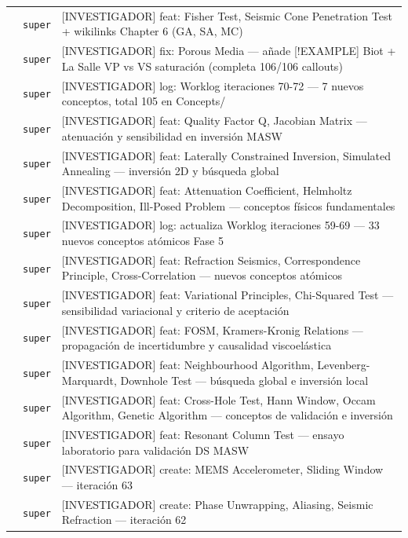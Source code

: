 \begin{longtable}{@{}p{1.7cm} p{1.5cm} p{12.2cm}@{}}
 & \texttt{\scriptsize super} & [INVESTIGADOR] feat: Fisher Test, Seismic Cone Penetration Test + wikilinks Chapter 6 (GA, SA, MC) \\
 & \texttt{\scriptsize super} & [INVESTIGADOR] fix: Porous Media --- añade [!EXAMPLE] Biot + La Salle VP vs VS saturación (completa 106/106 callouts) \\
 & \texttt{\scriptsize super} & [INVESTIGADOR] log: Worklog iteraciones 70-72 --- 7 nuevos conceptos, total 105 en Concepts/ \\
 & \texttt{\scriptsize super} & [INVESTIGADOR] feat: Quality Factor Q, Jacobian Matrix --- atenuación y sensibilidad en inversión MASW \\
 & \texttt{\scriptsize super} & [INVESTIGADOR] feat: Laterally Constrained Inversion, Simulated Annealing --- inversión 2D y búsqueda global \\
 & \texttt{\scriptsize super} & [INVESTIGADOR] feat: Attenuation Coefficient, Helmholtz Decomposition, Ill-Posed Problem --- conceptos físicos fundamentales \\
 & \texttt{\scriptsize super} & [INVESTIGADOR] log: actualiza Worklog iteraciones 59-69 --- 33 nuevos conceptos atómicos Fase 5 \\
 & \texttt{\scriptsize super} & [INVESTIGADOR] feat: Refraction Seismics, Correspondence Principle, Cross-Correlation --- nuevos conceptos atómicos \\
 & \texttt{\scriptsize super} & [INVESTIGADOR] feat: Variational Principles, Chi-Squared Test --- sensibilidad variacional y criterio de aceptación \\
 & \texttt{\scriptsize super} & [INVESTIGADOR] feat: FOSM, Kramers-Kronig Relations --- propagación de incertidumbre y causalidad viscoelástica \\
 & \texttt{\scriptsize super} & [INVESTIGADOR] feat: Neighbourhood Algorithm, Levenberg-Marquardt, Downhole Test --- búsqueda global e inversión local \\
 & \texttt{\scriptsize super} & [INVESTIGADOR] feat: Cross-Hole Test, Hann Window, Occam Algorithm, Genetic Algorithm --- conceptos de validación e inversión \\
 & \texttt{\scriptsize super} & [INVESTIGADOR] feat: Resonant Column Test --- ensayo laboratorio para validación DS MASW \\
 & \texttt{\scriptsize super} & [INVESTIGADOR] create: MEMS Accelerometer, Sliding Window --- iteración 63 \\
 & \texttt{\scriptsize super} & [INVESTIGADOR] create: Phase Unwrapping, Aliasing, Seismic Refraction --- iteración 62 \\

\end{longtable}
